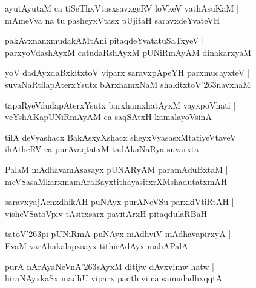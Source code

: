 \documentclass[twoside,12pt,openright]{book}
\def\S{\char'263}
\newcounter{shloka}[chapter]
\begin{document}
\begin{shloka}%
ayutAyutaM ca tiSeThxVtasxsavxgeRV loVkeV yathAsuKaM |\\
mAmeVva na tu pasheyxVtasx pUjitaH saravxdeYvateVH 
\end{shloka}

\begin{shloka}%
pakAvxnanxmudakAMtAni pitaqdeYvatatuSaTxyeV |\\
parxyoVdashAyxM catudaRshAyxM pUNiRmAyAM dinakarxyaM 
\end{shloka}

\begin{shloka}%
yoV dadAyxdaBxkitxtoV viparx saravxpApeYH parxmucayxteV |\\
suvaNaRtilapAterxYsutx bArxhamxNaM shakitxtoV\S navxhaM
\end{shloka}

\begin{shloka}%
tapaRyeVdudapAterxYsutx barxhamxhatAyxM vayxpoVhati |\\
veYshAKapUNiRmAyAM ca saqSAtxH kamalayoVsinA 
\end{shloka}

\begin{shloka}%
tilA deVyashacx BakAsxyXshacx sheyxVyasasxMtatiyeVtaveV |\\
ihAtheRV ca purAvaqtatxM tadAkaNaRya suvarxta
\end{shloka}

\begin{shloka}%
PalaM mAdhavamAsasayx pUNARyAM paramAduBxtaM |\\
meVSasaMkarxmamAraBayxtithayasitxrXMshadutatxmAH 
\end{shloka}

\begin{shloka}%
saravxyajAcnxdhikAH puNAyx purANeVSu parxkiVtiRtAH |\\
visheVSatoVpiv tAsitxsarx pavitArxH pitaqdulaRBaH
\end{shloka}

\begin{shloka}%
tatoV\S pi pUNiRmA puNAyx mAdhviV mAdhavapirxyA |\\
EvaM varAhakalapxsayx tithirAdAyx mahAPalA
\end{shloka}

\begin{shloka}%
purA nArAyaNeVnA\S sAyxM ditijw dAvxvimw hatw |\\
hiraNAyxkaSx madhU viparx paqthivi ca samudadhxqqtA
\end{shloka}
\end{document}
